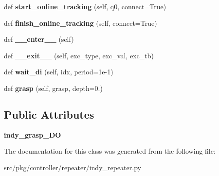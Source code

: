 \begin{DoxyCompactItemize}
\item 
\mbox{\label{classrnb-planning_1_1src_1_1pkg_1_1controller_1_1repeater_1_1indy__repeater_1_1indytraj__client_afc16fbb70500620425accc1c54348e73}} 
def {\bfseries start\+\_\+online\+\_\+tracking} (self, q0, connect=True)
\item 
\mbox{\label{classrnb-planning_1_1src_1_1pkg_1_1controller_1_1repeater_1_1indy__repeater_1_1indytraj__client_a6c986a861c29f63bb87d15b76b52941e}} 
def {\bfseries finish\+\_\+online\+\_\+tracking} (self, connect=True)
\item 
\mbox{\label{classrnb-planning_1_1src_1_1pkg_1_1controller_1_1repeater_1_1indy__repeater_1_1indytraj__client_a85d34a1bcbd7edcb962790219e18080f}} 
def {\bfseries \+\_\+\+\_\+enter\+\_\+\+\_\+} (self)
\item 
\mbox{\label{classrnb-planning_1_1src_1_1pkg_1_1controller_1_1repeater_1_1indy__repeater_1_1indytraj__client_acd6004ccb10cf961bc032cd03c9c451f}} 
def {\bfseries \+\_\+\+\_\+exit\+\_\+\+\_\+} (self, exc\+\_\+type, exc\+\_\+val, exc\+\_\+tb)
\item 
\mbox{\label{classrnb-planning_1_1src_1_1pkg_1_1controller_1_1repeater_1_1indy__repeater_1_1indytraj__client_a35dd3f0caf07ca91d92d6720fbffe9b4}} 
def {\bfseries wait\+\_\+di} (self, idx, period=1e-\/1)
\item 
\mbox{\label{classrnb-planning_1_1src_1_1pkg_1_1controller_1_1repeater_1_1indy__repeater_1_1indytraj__client_affe23da30cf023edd26963b95418ff41}} 
def {\bfseries grasp} (self, grasp, depth=0.)
\end{DoxyCompactItemize}
\subsection*{Public Attributes}
\begin{DoxyCompactItemize}
\item 
\mbox{\label{classrnb-planning_1_1src_1_1pkg_1_1controller_1_1repeater_1_1indy__repeater_1_1indytraj__client_a8e023943de4af6334c3412896661eeba}} 
{\bfseries indy\+\_\+grasp\+\_\+\+DO}
\end{DoxyCompactItemize}


The documentation for this class was generated from the following file\+:\begin{DoxyCompactItemize}
\item 
src/pkg/controller/repeater/indy\+\_\+repeater.\+py\end{DoxyCompactItemize}
